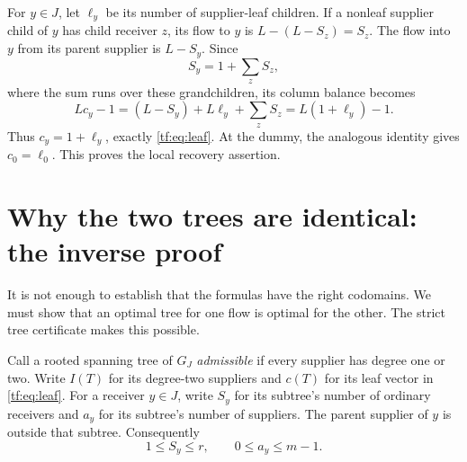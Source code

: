 \documentclass[11pt]{article}
\numberwithin{equation}{section}
\theoremstyle{definition}
\begin{document}
For $y\in J$, let $\ell_y$ be its number of supplier-leaf children. If a
nonleaf supplier child of $y$ has child receiver $z$, its flow to $y$ is
$L-(L-S_z)=S_z$. The flow into $y$ from its parent supplier is $L-S_y$.
Since
\[
 S_y=1+\sum_{z}S_z,
\]
where the sum runs over these grandchildren, its column balance becomes
\[
 Lc_y-1=(L-S_y)+L\ell_y+\sum_z S_z=L(1+\ell_y)-1.
\]
Thus $c_y=1+\ell_y$, exactly \eqref{tf:eq:leaf}. At the dummy, the analogous
identity gives $c_0=\ell_0$. This proves the local recovery assertion.

\section{Why the two trees are identical: the inverse proof}
\label{tf:sec:inverse}
It is not enough to establish that the formulas have the right codomains.
We must show that an optimal tree for one flow is optimal for the other.
The strict tree certificate makes this possible.

Call a rooted spanning tree of $G_J$ \emph{admissible} if every supplier
has degree one or two. Write $I(T)$ for its degree-two suppliers and
$c(T)$ for its leaf vector in \eqref{tf:eq:leaf}. For a receiver $y\in J$,
write $S_y$ for its subtree's number of ordinary receivers and $a_y$ for
its subtree's number of suppliers. The parent supplier of $y$ is outside
that subtree. Consequently
\begin{equation}
 1\le S_y\le r,\qquad 0\le a_y\le m-1.
 \label{tf:eq:subbounds}
\end{equation}
\end{document}
